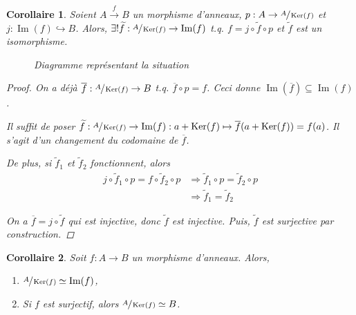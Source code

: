\documentclass{report}
\newtheorem*{coro}{Corollaire}
\theoremstyle{definition}
\theoremstyle{remark}
\def\im{\operatorname{Im}}
\def\noyau{\operatorname{Ker}}
\begin{document}
	\begin{coro}
		Soient $A \xrightarrow{f} B$ un morphisme d'anneaux, $p:A\to\sfrac{A}{\noyau(f)}$ et $j:\im(f)\hookrightarrow B$. Alors, $\exists!\widetilde{f}:\sfrac{A}{\noyau(f)}\to\im(f)$ t.q. $f=j\circ \widetilde{f}\circ p$ et $\widetilde{f}$ est un isomorphisme.

		\begin{figure}[h]
			\centering
			\caption{Diagramme repr\'esentant la situation}
		\end{figure}

		\begin{proof}
			On a d\'ej\`a $\overline{f}:\sfrac{A}{\noyau(f)}\to B$ t.q. $\overline{f}\circ p=f$. Ceci donne $\im(\overline{f}) \subseteq \im(f)$.

			Il suffit de poser $\widetilde{f} : \sfrac{A}{\noyau(f)}\to\im(f) : a+\noyau(f)\mapsto \overline{f}(a+\noyau(f))=f(a)$. Il s'agit d'un changement du codomaine de $\overline{f}$.

			De plus, si $\widetilde{f}_1$ et $\widetilde{f}_2$ fonctionnent, alors
			\begin{align*}
				j\circ \widetilde{f}_1\circ p = f\circ \widetilde{f}_2\circ p&\Rightarrow \widetilde{f}_1\circ p = \widetilde{f}_2\circ p\\
				&\Rightarrow \widetilde{f}_1 = \widetilde{f}_2
			\end{align*}

			On a $\overline{f}=j\circ \widetilde{f}$ qui est injective, donc $\widetilde{f}$ est injective. Puis, $\widetilde{f}$ est surjective par construction.
		\end{proof}
	\end{coro}

	\begin{coro}
		Soit $f:A\to B$ un morphisme d'anneaux. Alors,
		\begin{enumerate}
			\item $\sfrac{A}{\noyau(f)} \simeq \im(f)$,
			\item Si $f$ est surjectif, alors $\sfrac{A}{\noyau(f)} \simeq B$.
		\end{enumerate}
	\end{coro}
\end{document}
